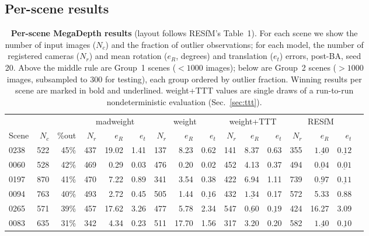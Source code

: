 \documentclass{article}
\begin{document}
\subsection{Per-scene results}\label{sec:perscene}
\begin{table}[t]\centering\footnotesize
\caption{\textbf{Per-scene MegaDepth results} (layout follows RESfM's Table~1). For each
scene we show the number of input images ($N_c$) and the fraction of outlier
observations; for each model, the number of registered cameras ($N_r$) and mean
rotation ($e_R$, degrees) and translation ($e_t$) errors, post-BA, seed 20. Above the middle rule are Group~1
scenes ($<1000$ images); below are Group~2 scenes ($>1000$ images, subsampled to $300$
for testing), each group ordered by outlier fraction. Winning results per scene are
marked in bold and underlined. weight+TTT values are single draws of a run-to-run
nondeterministic evaluation (Sec.~\ref{sec:ttt}).}
\label{tab:supp_perscene_md}
\setlength{\tabcolsep}{2.5pt}%
\begin{tabular}{lrrrrrrrrrrrrrrr}
\toprule
& & & \multicolumn{3}{c}{madweight} & \multicolumn{3}{c}{weight} & \multicolumn{3}{c}{weight+TTT} & \multicolumn{3}{c}{RESfM}\\
\cmidrule(lr){4-6}\cmidrule(lr){7-9}\cmidrule(lr){10-12}\cmidrule(lr){13-15}
Scene & $N_c$ & \%out & $N_r$ & $e_R$ & $e_t$ & $N_r$ & $e_R$ & $e_t$ & $N_r$ & $e_R$ & $e_t$ & $N_r$ & $e_R$ & $e_t$\\
\midrule
0238 & 522 & 45\% & 437 & 19.02 & 1.41 & 137 & 8.23 & 0.62 & 141 & 8.37 & 0.63 & 355 & $\underline{\mathbf{1.40}}$ & $\underline{\mathbf{0.12}}$\\
0060 & 528 & 42\% & 469 & 0.29 & 0.03 & 476 & 0.20 & 0.02 & 452 & 4.13 & 0.37 & 494 & $\underline{\mathbf{0.04}}$ & $\underline{\mathbf{0.01}}$\\
0197 & 870 & 41\% & 470 & 7.22 & 0.89 & 341 & 3.54 & 0.38 & 422 & 6.94 & 1.11 & 739 & $\underline{\mathbf{0.97}}$ & $\underline{\mathbf{0.11}}$\\
0094 & 763 & 40\% & 493 & 2.72 & 0.45 & 505 & 1.44 & $\underline{\mathbf{0.16}}$ & 432 & $\underline{\mathbf{1.34}}$ & 0.17 & 572 & 5.33 & 0.88\\
0265 & 571 & 39\% & 457 & 17.62 & 3.26 & 477 & 5.78 & 2.34 & 547 & $\underline{\mathbf{0.60}}$ & $\underline{\mathbf{0.19}}$ & 424 & 16.27 & 3.09\\
0083 & 635 & 31\% & 342 & 4.34 & 0.23 & 511 & 17.70 & 1.56 & 317 & 3.20 & 0.20 & 582 & $\underline{\mathbf{1.40}}$ & $\underline{\mathbf{0.10}}$\\

\end{tabular}
\end{table}
\end{document}
